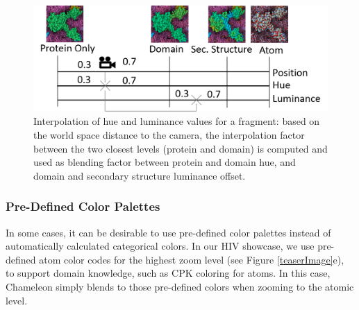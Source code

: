 \documentclass{egpubl}
\begin{document}
	
		\begin{figure}
			\centering
			\includegraphics[width=1\linewidth]{Figures/zoomfigure}
			\caption{Interpolation of hue and luminance values for a fragment: based on the world space distance to the camera, the interpolation factor between the two closest levels (protein and domain) is computed and used as blending factor between protein and domain hue, and domain and secondary structure luminance offset. 
				}
			\label{fig:zoom_continuum}
		\end{figure}
	
	
	\subsubsection{Pre-Defined Color Palettes}
	
	In some cases, it can be desirable to use pre-defined color palettes instead of automatically calculated categorical colors. 
	In our HIV showcase, we use pre-defined atom color codes for the highest zoom level (see Figure \ref{teaserImage}e), to support domain knowledge, such as CPK coloring for atoms. 
	In this case, Chameleon simply blends to those pre-defined colors when zooming to the atomic level. 
	
\end{document}
